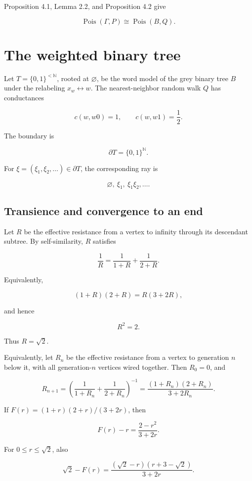 \documentclass[11pt,a4paper]{scrartcl}
\begin{document}
Proposition 4.1, Lemma 2.2, and Proposition 4.2 give

\[
\operatorname{Pois}(\Gamma,P)
\cong
\operatorname{Pois}(B,Q).
\]


\section{The weighted binary tree}\label{sec:the-weighted-binary-tree}


Let \(T=\{0,1\}^{<\mathbb N}\), rooted at \(\varnothing\), be the word model
of the grey binary tree \(B\) under the relabeling \(x_w\leftrightarrow w\).
The nearest-neighbor random walk \(Q\) has conductances

\[
c(w,w0)=1,
\qquad
c(w,w1)=\frac12 .
\]

The boundary is

\[
\partial T=\{0,1\}^{\mathbb N}.
\]

For \(\xi=(\xi_1,\xi_2,\ldots)\in\partial T\), the corresponding ray is

\[
\varnothing,\ \xi_1,\ \xi_1\xi_2,\ldots .
\]


\subsection{Transience and convergence to an end}\label{subsec:transience-and-convergence-to-an-end}


Let \(R\) be the effective resistance from a vertex to infinity through its
descendant subtree. By self-similarity, \(R\) satisfies

\[
\frac1R
=
\frac1{1+R}
+
\frac1{2+R}.
\]

Equivalently,

\[
(1+R)(2+R)=R(3+2R),
\]

and hence

\[
R^2=2.
\]

Thus \(R=\sqrt2\).

Equivalently, let \(R_n\) be the effective resistance from a
vertex to generation \(n\) below it, with all generation-\(n\) vertices wired
together. Then \(R_0=0\), and

\[
R_{n+1}
=
\left(
\frac1{1+R_n}
+
\frac1{2+R_n}
\right)^{-1}
=
\frac{(1+R_n)(2+R_n)}{3+2R_n}.
\]

If \(F(r)=(1+r)(2+r)/(3+2r)\), then

\[
F(r)-r=\frac{2-r^2}{3+2r}.
\]

For \(0\le r\le\sqrt2\), also

\[
\sqrt2-F(r)
=
\frac{(\sqrt2-r)(r+3-\sqrt2)}{3+2r}.
\]
\end{document}
